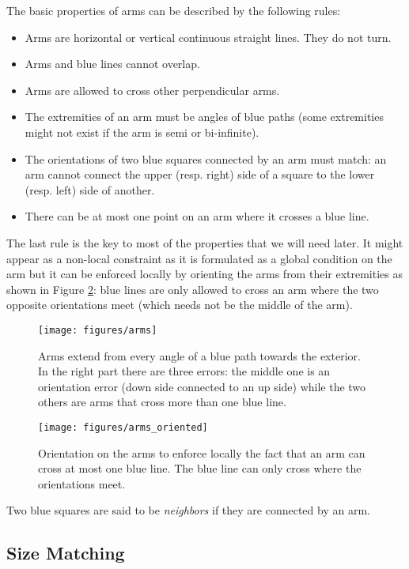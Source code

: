 \documentclass{jac}
\begin{document}
The basic properties of arms can be described by the following rules:
\begin{itemize}
    \item Arms are horizontal or vertical continuous straight lines. They do not turn.
    \item Arms and blue lines cannot overlap.
    \item Arms are allowed to cross other perpendicular arms.
    \item The extremities of an arm must be angles of blue paths (some extremities might not exist if the arm is semi or bi-infinite).
    \item The orientations of two blue squares connected by an arm must match: an arm cannot connect the upper (resp. right) side of a square to the lower (resp. left) side of another.
    \item There can be at most one point on an arm where it crosses a blue line.
\end{itemize}

The last rule is the key to most of the properties that we will need later. It might appear as a non-local constraint as it is formulated as a global condition on the arm but it can be enforced locally by orienting the arms from their extremities as shown in Figure \ref{fig:arms_oriented}: blue lines are only allowed to cross an arm where the two opposite orientations meet (which needs not be the middle of the arm).

\begin{figure}[htbp]
    \centering
    \texttt{[image: figures/arms]}
    \caption{Arms extend from every angle of a blue path towards the exterior. In the right part there are three errors: the middle one is an orientation error (down side connected to an up side) while the two others are arms that cross more than one blue line.}
    \label{fig:arms}
\end{figure}

\begin{figure}[htbp]
    \centering
    \texttt{[image: figures/arms\_oriented]}
    \caption{Orientation on the arms to enforce locally the fact that an arm can cross at most one blue line. The blue line can only cross where the orientations meet.}
    \label{fig:arms_oriented}
\end{figure}

Two blue squares are said to be \emph{neighbors} if they are connected by an arm.
\subsection{Size Matching} \label{sub:size_matching}
\end{document}
